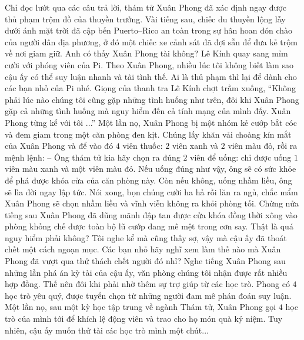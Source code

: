 	\vskip 0.1cm
	Chỉ đọc lướt qua các câu trả lời, thám tử Xuân Phong đã xác định ngay được thủ phạm trộm đồ của thuyền trưởng. Vài tiếng sau, chiếc du thuyền lộng lẫy dưới ánh mặt trời đã cập bến Puerto--Rico an toàn trong sự hân hoan đón chào của người dân địa phương, ở đó một chiếc xe cảnh sát đã đợi sẵn để đưa kẻ trộm về nơi giam giữ. 
	\vskip 0.1cm
	Anh có thấy Xuân Phong tài không? Lê Kính quay sang mỉm cười với phóng viên của Pi. Theo Xuân Phong, nhiều lúc tôi không biết làm sao cậu ấy có thể suy luận nhanh và tài tình thế. Ai là thủ phạm thì lại để dành cho các bạn nhỏ của Pi nhé.
	\vskip 0.1cm
	Giọng của thanh tra Lê Kính chợt trầm xuống, “Không phải lúc nào chúng tôi cũng gặp những tình huống như trên, đôi khi Xuân Phong gặp cả những tình huống mà nguy hiểm đến cả tính mạng của mình đấy. Xuân Phong từng kể với tôi ...”
	\vskip 0.1cm
	\textbf{\color{toancuabi}{Thử thách sống còn}}
	\vskip 0.1cm 
	Một lần nọ, Xuân Phong bị một nhóm kẻ cướp bắt cóc và đem giam trong một căn phòng đen kịt. Chúng lấy khăn vải choàng kín mắt của Xuân Phong và để vào đó $4$ viên thuốc: $2$ viên xanh và $2$ viên màu đỏ, rồi ra mệnh lệnh:
	\vskip 0.1cm
	--	Ông thám tử kia hãy chọn ra đúng $2$ viên để uống: chỉ được uống $1$ viên màu xanh và một viên màu đỏ. Nếu uống đúng như vậy, ông sẽ có sức khỏe để phá được khóa cửa của căn phòng này. Còn nếu không, uống nhầm liều, ông sẽ lìa đời ngay lập tức. 
	\vskip 0.1cm
	Nói xong, bọn chúng cười ha hả rồi lăn ra ngủ, chắc mẩm Xuân Phong sẽ chọn nhầm liều và vĩnh viễn không ra khỏi phòng tối. Chừng nửa tiếng sau Xuân Phong đã dũng mãnh đập tan được cửa khóa đồng thời xông vào phòng khống chế được toàn bộ lũ cướp đang mê mệt trong cơn say. 
	\vskip 0.1cm
	Thật là quá nguy hiểm phải không? Tôi nghe kể mà cũng thấy sợ, vậy mà cậu ấy đã thoát chết một cách ngoạn mục. Các bạn nhỏ hãy nghĩ xem làm thế nào mà Xuân Phong đã vượt qua thử thách chết người đó nhỉ? 
	\vskip 0.1cm
	Nghe tiếng Xuân Phong sau những lần phá án kỳ tài của cậu ấy, văn phòng chúng tôi nhận được rất nhiều hợp đồng. Thế nên đôi khi phải nhờ thêm sự trợ giúp từ các học trò. Phong có $4$ học trò yêu quý, được tuyển chọn từ những người đam mê phán đoán suy luận. Một lần nọ, sau một kỳ học tập trung về ngành Thám tử, Xuân Phong gọi $4$ học trò của mình tới để khích lệ động viên và trao cho họ món quà kỷ niệm. Tuy nhiên, cậu ấy muốn thử tài các học trò mình một chút...
